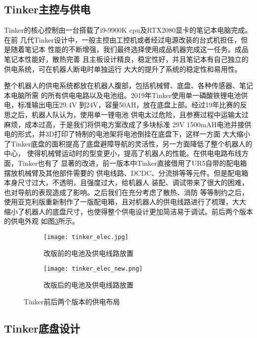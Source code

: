 \subsection{Tinker主控与供电}

Tinker的核心控制由一台搭载了i9-9900K cpu及RTX2080显卡的笔记本电脑完成。在前
几代Tinker设计中，一般主控由工控机或者经过电源改装的台式机担任，但是随着笔记本
性能的不断增强，我们最终选择使用成品机器完成这一任务。成品笔记本性能好，散热完善
且主板设计精良，稳定性好，并且笔记本有自己独立的供电系统，可在机器人断电时单独运行
大大的提升了系统的稳定性和易用性。

整个机器人的供电系统都放在机器人腹部，包括机械臂、底盘、各种传感器、笔记本电脑所需
的所有供电电路以及电池组。2019年Tinker使用单一磷酸铁锂电池供电，标准输出电压29.4V
到24V，容量50AH，放在底盘上部。经过19年比赛的反思之后，机器人队认为，使用单一锂电池
供电太过危险，且参赛过程中运输太过麻烦，成本过高，于是我们将供电方案改成了多块标准
29V 1500mAH电池并接供电的形式，并3D打印了特制的电池架将电池倒挂在底盘下，这样一方面
大大缩小了Tinker底盘的面积提高了底盘避障导航的灵活性，另一方面降低了整个机器人的中心，
使得机械臂运动时的型变更小，提高了机器人的性能。在供电电路布线方面，Tinker也有了
显著的改进，前一版本中Tinker直接借用了UR5自带的配电箱摆放机械臂及其他部件需要的
供电线路、DCDC、分流排等等元件。但是配电箱本身尺寸过大，不透明，且强度过大，给机器人
装配、调试带来了很大的困难，也对导航的表现造成了影响。之后我们在充分考虑了散热、消防
等等制约之后，使用亚克利版重新制作了一版配电箱，且对机器人的供电线路进行了梳理，大大
缩小了机器人的底盘尺寸，也使得整个供电设计更加简洁易于调试。前后两个版本的供电外观
如图\ref{fig:elec}所示。

\begin{figure}
\centering
\begin{subfigure}{.5\textwidth}
  \centering
  \texttt{[image: tinker\_elec.jpg]}
  \caption{改版前的电池及供电线路放置}
  \label{fig:old_elec}
\end{subfigure}%
\begin{subfigure}{.5\textwidth}
  \centering
  \texttt{[image: tinker\_elec\_new.png]}
  \caption{改版后的电池及供电线路放置}
  \label{fig:new_elec}
\end{subfigure}
\caption{Tinker前后两个版本的供电布局}
\label{fig:elec}
\end{figure}

\subsection{Tinker底盘设计}


